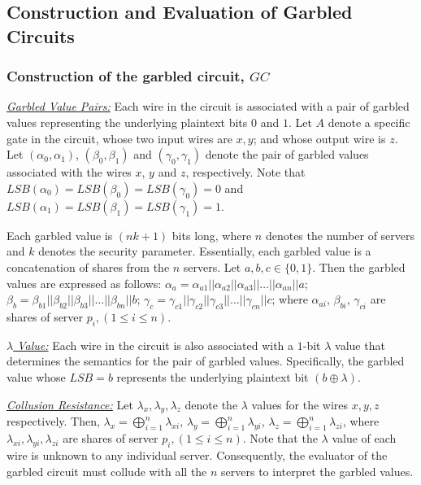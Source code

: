 \documentclass[10pt,journal,cspaper,compsoc]{IEEEtran}
\begin{document}
\subsection{Construction and Evaluation of Garbled Circuits}
\label{sec_garbled_circuit_BMR}


\subsubsection{Construction of the garbled circuit, $GC$}
\label{sec_garbled_circuit_BMR_construction}

\underline{\em Garbled Value Pairs:} Each wire in the circuit is associated with a pair of garbled values representing the underlying plaintext bits $0$ and $1$. Let $A$ denote a specific gate in the circuit, whose two input wires are $x,y$; and whose output wire is $z$. Let $(\alpha_0, \alpha_1)$, $(\beta_0, \beta_1)$ and $(\gamma_0, \gamma_1)$ denote the pair of garbled values associated with the wires $x$, $y$ and $z$, respectively. Note that $LSB(\alpha_0) = LSB(\beta_0) = LSB(\gamma_0) = 0$ and $LSB(\alpha_1) = LSB(\beta_1) = LSB(\gamma_1) = 1$.


Each garbled value is $(nk+1)$ bits long, where $n$ denotes the number of servers and $k$ denotes the security parameter. Essentially, each garbled value is a concatenation of shares from the $n$ servers. Let $a, b ,c \in\{0, 1\}$. Then the garbled values are expressed as follows: $\alpha_{a} = \alpha_{a1} || \alpha_{a2} || \alpha_{a3} || \ldots || \alpha_{an} ||a$; $\beta_{b} = \beta_{b1} || \beta_{b2} || \beta_{b3} || \ldots || \beta_{bn} || b$; $\gamma_{c} = \gamma_{c1} || \gamma_{c2} || \gamma_{c3} || \ldots ||\gamma_{cn} || c$; where $\alpha_{ai}$, $\beta_{bi}$, $\gamma_{ci}$ are shares of server $p_i, (1\le i\le n)$.


\underline{\em $\lambda$ Value:} Each wire in the circuit is also associated with a $1$-bit $\lambda$ value that determines the semantics for the pair of garbled values. Specifically, the garbled value whose $LSB = b$ represents the underlying plaintext bit $(b\oplus \lambda)$.


\underline{\em Collusion Resistance:} Let $\lambda_x, \lambda_y, \lambda_z$ denote the $\lambda$ values for the wires $x,y,z$ respectively. Then, $\lambda_x = \bigoplus_{i = 1}^{n}\lambda_{xi}$, $\lambda_y = \bigoplus_{i = 1}^{n}\lambda_{yi}$, $\lambda_z = \bigoplus_{i = 1}^{n}\lambda_{zi}$, where $\lambda_{xi}, \lambda_{yi}, \lambda_{zi}$ are shares of server $p_i, (1\le i\le n)$. Note that the $\lambda$ value of each wire is unknown to any individual server. Consequently, the evaluator of the garbled circuit must collude with all the $n$ servers to interpret the garbled values.
\end{document}
